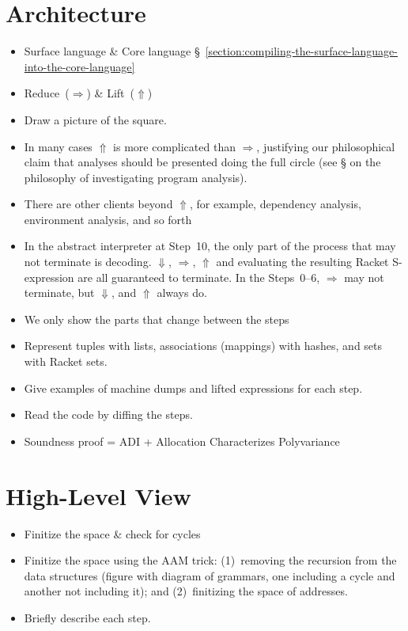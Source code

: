 \documentclass[12pt, oneside]{book}
\begin{document}
\section{Architecture}

\begin{itemize}
  \item Surface language \& Core language §~\ref{section:compiling-the-surface-language-into-the-core-language}
  \item Reduce~(\(⇒\)) \& Lift~(\(⇑\))
  \item Draw a picture of the square.
  \item In many cases \(⇑\) is more complicated than \(⇒\), justifying our philosophical claim that analyses should be presented doing the full circle (see § on the philosophy of investigating program analysis).
  \item There are other clients beyond \(⇑\), for example, dependency analysis, environment analysis, and so forth
  \item In the abstract interpreter at Step~10, the only part of the process that may not terminate is decoding. \(⇓\), \(⇒\), \(⇑\) and evaluating the resulting Racket S-expression are all guaranteed to terminate. In the Steps~0–6, \(⇒\) may not terminate, but \(⇓\), and \(⇑\) always do.
  \item We only show the parts that change between the steps
  \item Represent tuples with lists, associations (mappings) with hashes, and sets with Racket sets.
  \item Give examples of machine dumps and lifted expressions for each step.
  \item Read the code by diffing the steps.
  \item Soundness proof = ADI + Allocation Characterizes Polyvariance
\end{itemize}

\section{High-Level View}

\begin{itemize}
  \item Finitize the space \& check for cycles
  \item Finitize the space using the AAM trick: (1)~removing the recursion from the data structures (figure with diagram of grammars, one including a cycle and another not including it); and (2)~finitizing the space of addresses.
  \item Briefly describe each step.
\end{itemize}
\end{document}
